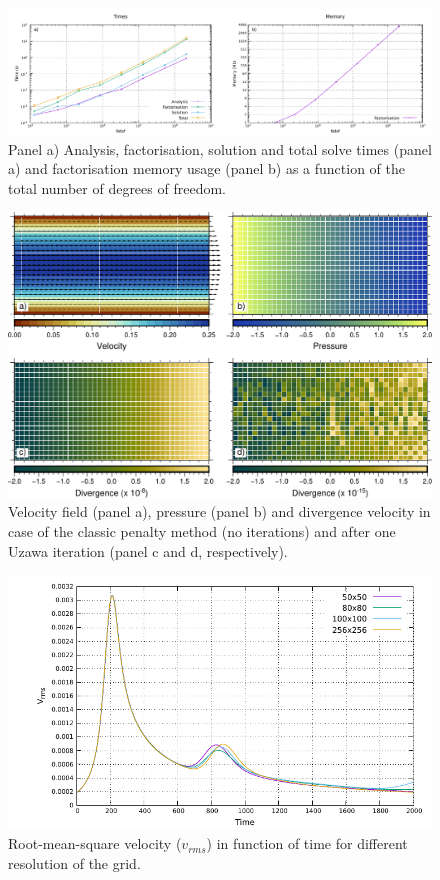 \documentclass[draft,tec]{agutexSI2019}
\begin{document}
\begin{figure}
\noindent\includegraphics[width=\textwidth]{./Figures/MUMPS.pdf}
\caption{Panel a) Analysis, factorisation, solution and total solve times (panel a) and factorisation memory usage (panel b) as a function of the total number of degrees of freedom.}
\label{fig:MUMPS}
\end{figure}

\begin{figure}
\noindent\includegraphics[width=\textwidth]{./Figures/Poiseuille.pdf}
\caption{Velocity field (panel a), pressure (panel b) and divergence velocity in case of the classic penalty method (no iterations) and after one Uzawa iteration (panel c and d, respectively).}
\label{fig:poiseuille}
\end{figure}

\begin{figure}
\noindent\includegraphics[width=\textwidth]{./Figures/RT.pdf}
\caption{Root-mean-square velocity ($v_{rms}$) in function of time for different resolution of the grid.}
\label{fig:RT}
\end{figure}
\end{document}
